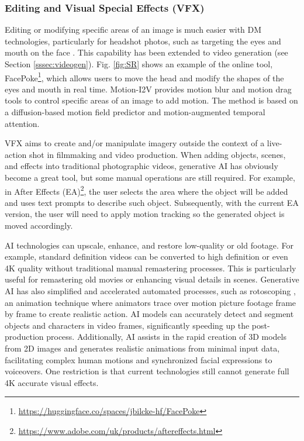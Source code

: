 \documentclass[11pt,a4paper]{article}
\begin{document}
\subsubsection{Editing and Visual Special Effects (VFX)}

Editing or modifying specific areas of an image is much easier with DM technologies, particularly for headshot photos, such as targeting the eyes and mouth on the face \cite{guo2024liveportrait}. This capability has been extended to video generation (see Section \ref{sssec:videogen}). Fig. \ref{fig:SR} shows an example of the online tool, FacePoke\footnote{\url{https://huggingface.co/spaces/jbilcke-hf/FacePoke}}, which allows users to move the head and modify the shapes of the eyes and mouth in real time. Motion-I2V \cite{Shi:Motion-I2V:2024} provides motion blur and motion drag tools to control specific areas of an image to add motion. The method is based on a diffusion-based motion field predictor and motion-augmented temporal attention.

VFX aims to create and/or manipulate imagery outside the context of a live-action shot in filmmaking and video production. When adding objects, scenes, and effects into traditional photographic videos, generative AI has obviously become a great tool, but some manual operations are still required. For example, in After Effects (EA)\footnote{\url{https://www.adobe.com/uk/products/aftereffects.html}}, the user selects the area where the object will be added and uses text prompts to describe such object. Subsequently, with the current EA version, the user will need to apply motion tracking so the generated object is moved accordingly.

AI technologies can upscale, enhance, and restore low-quality or old footage. For example, standard definition videos can be converted to high definition or even 4K quality without traditional manual remastering processes. This is particularly useful for remastering old movies or enhancing visual details in scenes. Generative AI has also simplified and accelerated automated processes, such as rotoscoping \cite{Tous:Lester:2024}, an animation technique where animators trace over motion picture footage frame by frame to create realistic action. AI models can accurately detect and segment objects and characters in video frames, significantly speeding up the post-production process. Additionally, AI assists in the rapid creation of 3D models from 2D images and generates realistic animations from minimal input data, facilitating complex human motions and synchronized facial expressions to voiceovers. One restriction is that current technologies still cannot generate full 4K accurate visual effects.
\end{document}
